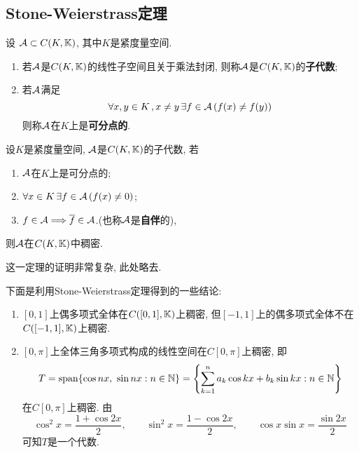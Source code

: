     \subsection{Stone-Weierstrass定理}

    \begin{Definition}
    设 $ \mathcal{A}\subset C(K,\mathbb{K}) $, 其中$ K $是紧度量空间.
    \begin{enumerate}[(1)]
    \item 若$ \mathcal{A} $是$ C(K,\mathbb{K}) $的线性子空间且关于乘法封闭, 则称$ \mathcal{A} $是$ C(K,\mathbb{K}) $的\textbf{子代数};
    \item 若$ \mathcal{A} $满足
    \[
    \forall x,y\in K\,,x\ne y\,\exists f\in\mathcal{A}\,(f(x)\ne f(y))
    \]
    则称$ \mathcal{A} $在$ K $上是\textbf{可分点的}.
    \end{enumerate}
    \end{Definition}

    \begin{Theorem}
    设$ K $是紧度量空间, $ \mathcal{A} $是$ C(K,\mathbb{K}) $的子代数, 若
    \begin{enumerate}[(1)]
    \item $ \mathcal{A} $在$ K $上是可分点的;
    \item $ \forall x\in K\,\exists f\in\mathcal{A}\,(f(x)\ne 0) $;
    \item $ f\in\mathcal{A}\Longrightarrow \overline{f}\in\mathcal{A} $.(也称$ \mathcal{A} $是\textbf{自伴}的),
    \end{enumerate}
    则$ \mathcal{A} $在$ C(K,\mathbb{K}) $中稠密.
    \end{Theorem}

    这一定理的证明非常复杂, 此处略去.

    \begin{Example}
    下面是利用Stone-Weierstrass定理得到的一些结论:
    \begin{enumerate}[(1)]
    \item $ [0,1] $上偶多项式全体在$ C([0,1],\mathbb{K}) $上稠密, 但$ [-1,1] $上的偶多项式全体不在$ C([-1,1],\mathbb{K}) $上稠密.
    \item $ [0,\pi] $上全体三角多项式构成的线性空间在$ C[0,\pi] $上稠密, 即
    \[
    T=\mathrm{span} \{ \cos nx,\ \sin nx : n\in\mathbb{N} \}=\left\{ \sum_{k=1}^na_k\cos kx+b_k\sin kx : n\in\mathbb{N} \right\}
    \]
    在$ C[0,\pi] $上稠密. 由
    \[
    \cos^2x=\frac{1+\cos 2x}{2},\qquad \sin^2x=\frac{1-\cos 2x}{2},\qquad \cos x\sin x=\frac{\sin 2x}{2}
    \]
    可知$ T $是一个代数.
    \end{enumerate}
    \end{Example}

